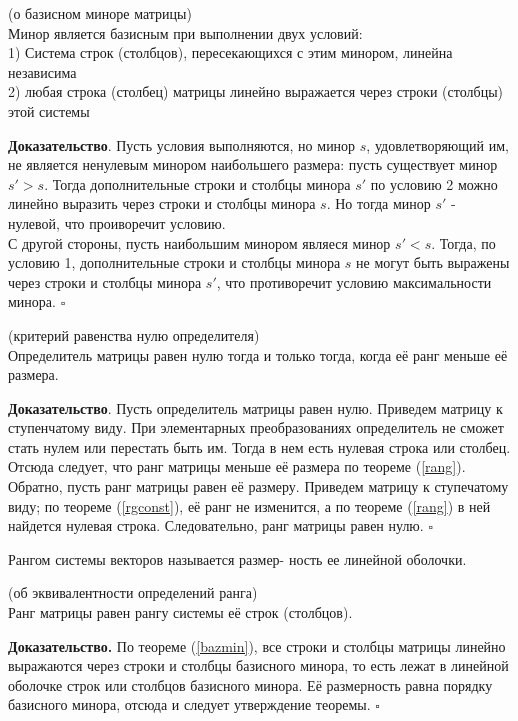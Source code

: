 \begin{theor}\label{bazmin}
(о базисном миноре матрицы)\\
Минор является базисным при выполнении двух условий:\\
1) Система строк (столбцов), пересекающихся с этим минором, линейна независима
\\
2) любая строка (столбец) матрицы линейно выражается через строки (столбцы) 
этой системы
\end{theor}
\textbf{Доказательство}. Пусть условия выполняются, но минор $s$, 
удовлетворяющий им, не является ненулевым минором наибольшего размера: пусть 
существует минор $s'>s$. Тогда дополнительные строки и столбцы минора $s'$ по 
условию 2 можно линейно выразить через строки и столбцы минора $s$. Но тогда 
минор $s'$ - нулевой, что проиворечит условию. \\
С другой стороны, пусть наибольшим минором являеся минор $s'<s$. Тогда, по 
условию 1, дополнительные строки и столбцы минора $s$ не могут быть выражены 
через строки и столбцы минора $s'$, что противоречит условию максимальности 
минора. $\square$



\begin{theor}
(критерий равенства нулю определителя)\\
Определитель матрицы равен нулю тогда и только тогда, когда её ранг меньше её 
размера.
\end{theor}
\textbf{Доказательство}. Пусть определитель матрицы равен нулю. Приведем 
матрицу к ступенчатому виду. При элементарных преобразованиях определитель не 
сможет стать нулем или перестать быть им. Тогда в нем есть нулевая строка или 
столбец. Отсюда следует, что ранг матрицы меньше её размера по теореме
(\ref{rang}). Обратно, пусть ранг матрицы равен её размеру. Приведем матрицу к 
ступечатому виду; по теореме (\ref{rgconst}), её ранг не изменится, а по 
теореме (\ref{rang}) в ней найдется нулевая строка. Следовательно, ранг матрицы
равен нулю. $\square$


\begin{defin}
Рангом системы векторов называется размер-
ность ее линейной оболочки. 
\end{defin} 


\begin{theor}
(об эквивалентности определений ранга)\\
Ранг матрицы равен рангу системы её строк (столбцов).
\end{theor}
\textbf{Доказательство.} По теореме (\ref{bazmin}), все строки и столбцы
матрицы линейно выражаются через строки и столбцы базисного минора, то есть 
лежат в линейной оболочке строк или столбцов базисного минора. Её размерность 
равна порядку базисного минора, отсюда и следует утверждение теоремы. $\square$



